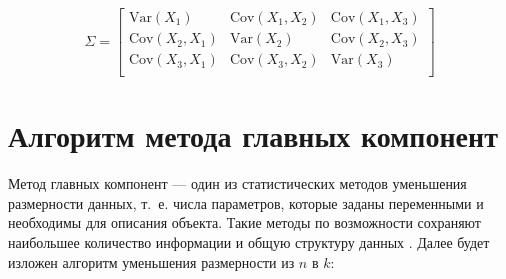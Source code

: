 \begin{equation}\label{eq:covariance_matrix}
	\Sigma = 
	\begin{bmatrix}
		\text{Var}(X_1) & \text{Cov}(X_1, X_2) & \text{Cov}(X_1, X_3) \\
		\text{Cov}(X_2, X_1) & \text{Var}(X_2) & \text{Cov}(X_2, X_3) \\
		\text{Cov}(X_3, X_1) & \text{Cov}(X_3, X_2) & \text{Var}(X_3) \\
	\end{bmatrix}
\end{equation}

\section{Алгоритм метода главных компонент}

Метод главных компонент --- один из статистических методов уменьшения размерности данных, т.~е. числа параметров, которые заданы переменными и необходимы для описания объекта. Такие методы по возможности сохраняют наибольшее количество информации и общую структуру данных \cite{orlov, polyak}. Далее будет изложен алгоритм уменьшения размерности из $n$ в $k$:

